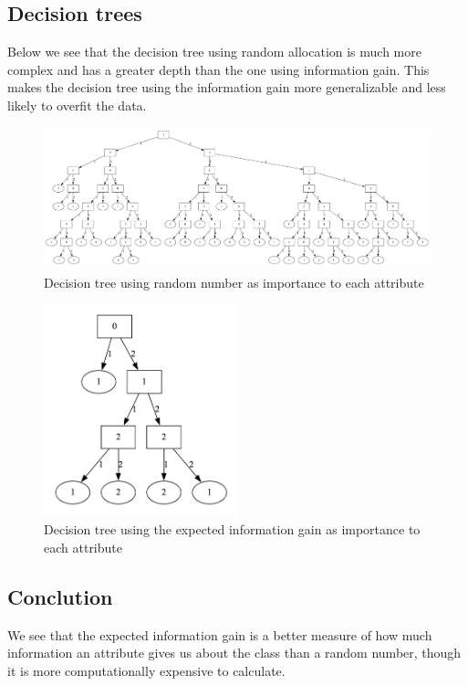 \documentclass{article}
\begin{document}
\subsection*{Decision trees}

Below we see that the decision tree using random allocation is much more complex and has a greater depth than the one using information gain.
This makes the decision tree using the information gain more generalizable and less likely to overfit the data.

\begin{figure}[t]
    \centering
    \includegraphics[width=\linewidth]{images/random.png}
    \caption{Decision tree using random number as importance to each attribute}
    \label{fig:image2}
\end{figure}

\begin{figure}[t]
    \centering
    \includegraphics[width=0.5\textwidth]{images/information_gain.png}
    \caption{Decision tree using the expected information gain as importance to each attribute}
    \label{fig:image3}
\end{figure}

\subsection*{Conclution}

We see that the expected information gain is a better measure of how much information an attribute gives us about the class than a random number, though it is more computationally expensive to calculate.
\end{document}
